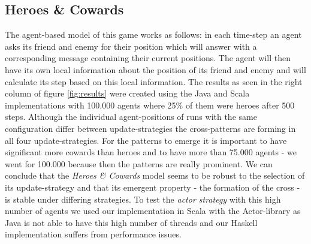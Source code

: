 \subsection{Heroes \& Cowards}
The agent-based model of this game works as follows: in each time-step an agent asks its friend and enemy for their position which will answer with a corresponding message containing their current positions. The agent will then have its own local information about the position of its friend and enemy and will calculate its step based on this local information.
The results as seen in the right column of figure \ref{fig:results} were created using the Java and Scala implementations with 100.000 agents where 25\% of them were heroes after 500 steps. Although the individual agent-positions of runs with the same configuration differ between update-strategies the cross-patterns are forming in all four update-strategies. For the patterns to emerge it is important to have significant more cowards than heroes and to have more than 75.000 agents - we went for 100.000 because then the patterns are really prominent. We can conclude that the \textit{Heroes \& Cowards} model seems to be robust to the selection of its update-strategy and that its emergent property - the formation of the cross - is stable under differing strategies. To test the \textit{actor strategy} with this high number of agents we used our implementation in Scala with the Actor-library as Java is not able to have this high number of threads and our Haskell implementation suffers from performance issues.